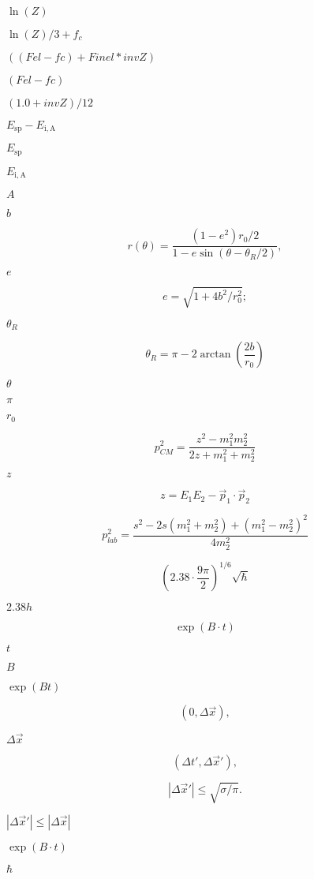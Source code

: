 \documentclass{article}
\begin{document}
$ \ln(Z) $
\pagebreak

$ \ln(Z)/3 + f_c $
\pagebreak

$ ((Fel-fc)+Finel*invZ)$
\pagebreak

$ (Fel-fc)$
\pagebreak

$ (1.0+invZ)/12 $
\pagebreak

$E_\mathrm{sp}-E_\mathrm{i,A}$
\pagebreak

$E_\mathrm{sp}$
\pagebreak

$E_\mathrm{i,A}$
\pagebreak

$A$
\pagebreak

$b$
\pagebreak

\[ r(\theta) = \frac{(1-e^2)r_0/2}{1-e \sin(\theta-\theta_R/2)}, \]
\pagebreak

$e$
\pagebreak

\[ e = \sqrt{1+4b^2/r_0^2}; \]
\pagebreak

$\theta_R$
\pagebreak

\[ \theta_R = \pi - 2\arctan\left(\frac{2b}{r_0}\right) \]
\pagebreak

$\theta$
\pagebreak

$\pi$
\pagebreak

$r_0$
\pagebreak

\[ p_{CM}^2 = \frac{z^2 - m_1^2 m_2^2}{2 z + m_1^2 + m_2^2} \]
\pagebreak

$z$
\pagebreak

\[ z = E_1 E_2 - \vec{p}_1\cdot\vec{p}_2 \]
\pagebreak

\[ p_{lab}^2 = \frac{s^2 - 2 s (m_1^2 + m_2^2) + {(m_1^2 - m_2^2)}^2}{4 m_2^2} \]
\pagebreak

\[ {\left(2.38\cdot\frac{9\pi}{2}\right)}^{1/6}\sqrt\hbar \]
\pagebreak

$2.38h$
\pagebreak

\[ \exp(B\cdot t) \]
\pagebreak

$t$
\pagebreak

$B$
\pagebreak

$\exp(Bt)$
\pagebreak

\[ (0, \Delta\vec{x}), \]
\pagebreak

$\Delta\vec{x}$
\pagebreak

\[ (\Delta t', \Delta\vec{x}'), \]
\pagebreak

\[ |\Delta\vec{x}'| \leq \sqrt{\sigma/\pi}.\]
\pagebreak

$|\Delta\vec{x}'|\leq|\Delta\vec{x}|$
\pagebreak

$\exp(B\cdot t)$
\pagebreak

$\hbar$
\pagebreak
\end{document}
